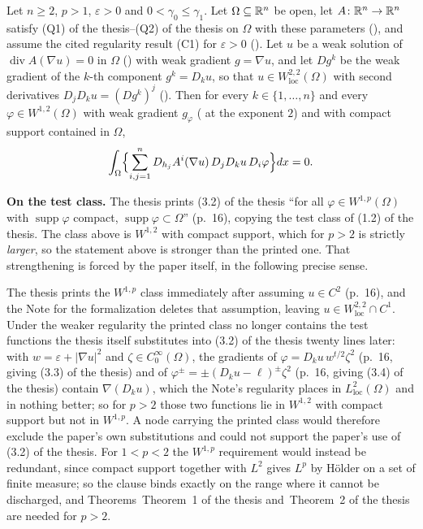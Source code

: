 \begin{helper}
Let $n\ge2$, $p>1$, $\varepsilon>0$ and $0<\gamma_0\le\gamma_1$.  Let
$\Omega\subseteq\mathbb{R}^n$ be open, let $A\colon\mathbb{R}^n\to\mathbb{R}^n$ satisfy
(Q1) of the thesis--(Q2) of the thesis on $\Omega$ with these parameters
(), and assume the cited regularity result (C1)
for $\varepsilon>0$ ().  Let $u$ be a weak
solution of $\operatorname{div}A(\nabla u)=0$ in $\Omega$
() with weak gradient $g=\nabla u$, and let
$Dg^k$ be the weak gradient of the $k$-th component $g^k=D_ku$, so that
$u\in W^{2,2}_{\mathrm{loc}}(\Omega)$ with second derivatives
$D_jD_ku=(Dg^k)^j$ ().  Then for every
$k\in\{1,\dots,n\}$ and every $\varphi\in W^{1,2}(\Omega)$ with weak gradient
$g_\varphi$ ( at the exponent $2$) and with compact support
contained in $\Omega$,
\[
\int_\Omega\Bigl\{\sum_{i,j=1}^nD_{h_j}A^i(\nabla u)\,D_jD_ku\,D_i\varphi\Bigr\}dx=0 .
\]

\textbf{On the test class.}  The thesis prints (3.2) of the thesis ``for all
$\varphi\in W^{1,p}(\Omega)$ with $\operatorname{supp}\varphi$ compact,
$\operatorname{supp}\varphi\subset\Omega$'' (p.~16), copying the test class of
(1.2) of the thesis.  The class above is $W^{1,2}$ with compact support, which for
$p>2$ is strictly \emph{larger}, so the statement above is stronger than the
printed one.  That strengthening is forced by the paper itself, in the following
precise sense.

The thesis prints the $W^{1,p}$ class immediately after assuming
$u\in C^2$ (p.~16), and the Note for the formalization deletes that assumption,
leaving $u\in W^{2,2}_{\mathrm{loc}}\cap C^1$.  Under the weaker regularity the
printed class no longer contains the test functions the thesis itself
substitutes into (3.2) of the thesis twenty lines later: with $w=\varepsilon+|\nabla
u|^2$ and $\zeta\in C_0^\infty(\Omega)$, the gradients of
$\varphi=D_ku\,w^{t/2}\zeta^2$ (p.~16, giving (3.3) of the thesis) and of
$\varphi^{\pm}=\pm(D_ku-\ell)^{\pm}\zeta^2$ (p.~16, giving (3.4) of the thesis)
contain $\nabla(D_ku)$, which the Note's regularity places in
$L^2_{\mathrm{loc}}(\Omega)$ and in nothing better; so for $p>2$ those two
functions lie in $W^{1,2}$ with compact support but not in $W^{1,p}$.  A node
carrying the printed class would therefore exclude the paper's own
substitutions and could not support the paper's use of (3.2) of the thesis.  For
$1<p<2$ the $W^{1,p}$ requirement would instead be redundant, since compact
support together with $L^2$ gives $L^p$ by H\"older on a set of finite measure;
so the clause binds exactly on the range where it cannot be discharged, and
Theorems~Theorem~1 of the thesis and~Theorem~2 of the thesis are needed for $p>2$.


\end{helper}
